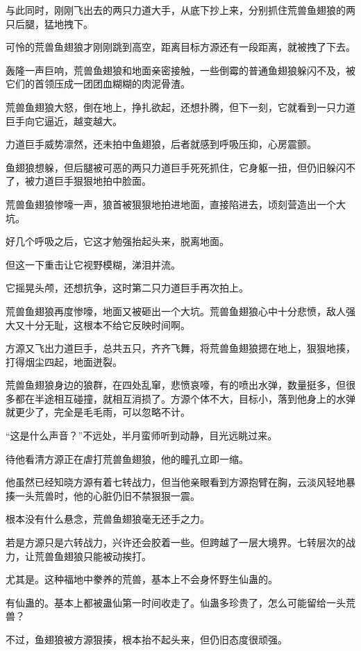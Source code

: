 \begin{this_body}
与此同时，刚刚飞出去的两只力道大手，从底下抄上来，分别抓住荒兽鱼翅狼的两只后腿，猛地拽下。

可怜的荒兽鱼翅狼才刚刚跳到高空，距离目标方源还有一段距离，就被拽了下去。

轰隆一声巨响，荒兽鱼翅狼和地面亲密接触，一些倒霉的普通鱼翅狼躲闪不及，被它们的首领压成一团团血糊糊的肉泥骨渣。

荒兽鱼翅狼大怒，倒在地上，挣扎欲起，还想扑腾，但下一刻，它就看到一只力道巨手向它逼近，越变越大。

力道巨手威势凛然，还未拍中鱼翅狼，后者就感到呼吸压抑，心房震颤。

鱼翅狼想躲，但后腿被可恶的两只力道巨手死死抓住，它身躯一扭，但仍旧躲闪不了，被力道巨手狠狠地拍中脸面。

荒兽鱼翅狼惨嚎一声，狼首被狠狠地拍进地面，直接陷进去，顷刻营造出一个大坑。

好几个呼吸之后，它这才勉强抬起头来，脱离地面。

但这一下重击让它视野模糊，涕泪并流。

它摇晃头颅，还想抗争，这时第二只力道巨手再次拍上。

荒兽鱼翅狼再度惨嚎，地面又被砸出一个大坑。荒兽鱼翅狼心中十分悲愤，敌人强大又十分无耻，这根本不给它反映时间啊。

方源又飞出力道巨手，总共五只，齐齐飞舞，将荒兽鱼翅狼摁在地上，狠狠地揍，打得烟尘四起，地面迸裂。

荒兽鱼翅狼身边的狼群，在四处乱窜，悲愤哀嚎，有的喷出水弹，数量挺多，但很多都在半途相互碰撞，就相互消损了。方源个体不大，目标小，落到他身上的水弹就更少了，完全是毛毛雨，可以忽略不计。

“这是什么声音？”不远处，半月蛮师听到动静，目光远眺过来。

待他看清方源正在虐打荒兽鱼翅狼，他的瞳孔立即一缩。

他虽然已经知晓方源有着七转战力，但当他亲眼看到方源抱臂在胸，云淡风轻地暴揍一头荒兽时，他的心脏仍旧不禁狠狠一震。

根本没有什么悬念，荒兽鱼翅狼毫无还手之力。

若是方源只是六转战力，兴许还会胶着一些。但跨越了一层大境界。七转层次的战力，让荒兽鱼翅狼只能被动挨打。

尤其是。这种福地中豢养的荒兽，基本上不会身怀野生仙蛊的。

有仙蛊的。基本上都被蛊仙第一时间收走了。仙蛊多珍贵了，怎么可能留给一头荒兽？

不过，鱼翅狼被方源狠揍，根本抬不起头来，但仍旧态度很顽强。


\end{this_body}

